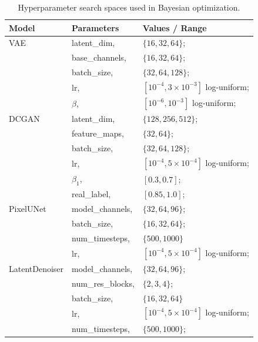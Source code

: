 \documentclass[runningheads]{llncs}
\begin{document}
\begin{table}[H]
    \centering
    \caption{Hyperparameter search spaces used in Bayesian optimization.}
    \label{tab:hpo_spaces}
    \begin{tabular}{p{}p{}p{}}
        \toprule
        \textbf{Model} & \textbf{Parameters} & \textbf{Values / Range} \\
        \midrule
        VAE & latent\_dim, & $\{16,32,64\}$; \\
        ~ & base\_channels, & $\{16,32,64\}$; \\
        ~ & batch\_size, & $\{32,64,128\}$; \\
        ~ & lr, & $[10^{-4}, 3\times 10^{-3}]$ log-uniform; \\
        ~ & $\beta$, & $[10^{-6}, 10^{-3}]$ log-uniform; \\
        \midrule
        DCGAN & latent\_dim, & $\{128,256,512\}$; \\
        ~ & feature\_maps, & $\{32,64\}$; \\
        ~ & batch\_size, &$\{32,64,128\}$; \\
        ~ & lr, & $[10^{-4}, 5\times 10^{-4}]$ log-uniform; \\
        ~ & $\beta_1$, & $[0.3,0.7]$; \\
        ~ & real\_label, & $[0.85,1.0]$; \\
        \midrule
        PixelUNet & model\_channels, & $\{32,64,96\}$; \\
        ~ & batch\_size, & $\{16,32,64\}$; \\
        ~ & num\_timesteps, & $\{500,1000\}$ \\
        ~ & lr, & $[10^{-4}, 5\times 10^{-4}]$ log-uniform; \\
        \midrule
        LatentDenoiser & model\_channels, & $\{32,64,96\}$; \\
        ~ & num\_res\_blocks, & $\{2,3,4\}$; \\
        ~ & batch\_size, & $\{16,32,64\}$ \\
        ~ & lr, & $[10^{-4}, 5\times 10^{-4}]$ log-uniform; \\
        ~ & num\_timesteps, & $\{500,1000\}$; \\
        \bottomrule
    \end{tabular}
\end{table}
\end{document}
